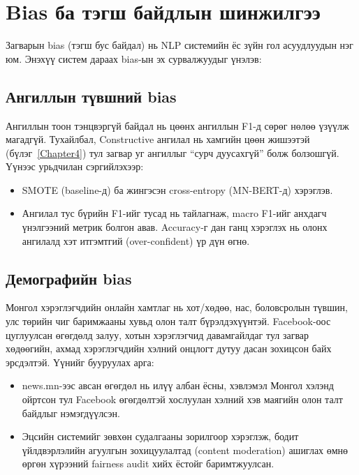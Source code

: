 \section{Bias ба тэгш байдлын шинжилгээ}

Загварын bias (тэгш бус байдал) нь NLP системийн ёс зүйн гол асуудлуудын нэг
юм. Энэхүү систем дараах bias-ын эх сурвалжуудыг үнэлэв:

\subsection{Ангиллын түвшний bias}

Ангиллын тоон тэнцвэргүй байдал нь цөөнх ангиллын F1-д сөрөг нөлөө үзүүлж
магадгүй. Тухайлбал, Constructive ангилал нь хамгийн цөөн жишээтэй
(бүлэг~\ref{Chapter4}) тул загвар уг ангиллыг ``сурч дуусахгүй'' болж
болзошгүй. Үүнээс урьдчилан сэргийлэхээр:

\begin{itemize}
  \item SMOTE (baseline-д) ба жингэсэн cross-entropy (MN-BERT-д) хэрэглэв.
  \item Ангилал тус бүрийн F1-ийг тусад нь тайлагнаж, macro F1-ийг анхдагч
    үнэлгээний метрик болгон авав. Accuracy-г дан ганц хэрэглэх нь олонх
    ангилалд хэт итгэмтгий (over-confident) үр дүн өгнө.
\end{itemize}

\subsection{Демографийн bias}

Монгол хэрэглэгчдийн онлайн хамтлаг нь хот/хөдөө, нас, боловсролын түвшин,
улс төрийн чиг баримжааны хувьд олон талт бүрэлдэхүүнтэй. Facebook-оос
цуглуулсан өгөгдөлд залуу, хотын хэрэглэгчид давамгайлдаг тул загвар
хөдөөгийн, ахмад хэрэглэгчдийн хэлний онцлогт дутуу дасан зохицсон байх
эрсдэлтэй. Үүнийг бууруулах арга:

\begin{itemize}
  \item news.mn-ээс авсан өгөгдөл нь илүү албан ёсны, хэвлэмэл Монгол
    хэлэнд ойртсон тул Facebook өгөгдөлтэй хослуулан хэлний хэв маягийн
    олон талт байдлыг нэмэгдүүлсэн.
  \item Эцсийн системийг зөвхөн судалгааны зорилгоор хэрэглэж, бодит
    үйлдвэрлэлийн агуулгын зохицуулалтад (content moderation) ашиглах
    өмнө өргөн хүрээний fairness audit хийх ёстойг баримтжуулсан.
\end{itemize}


